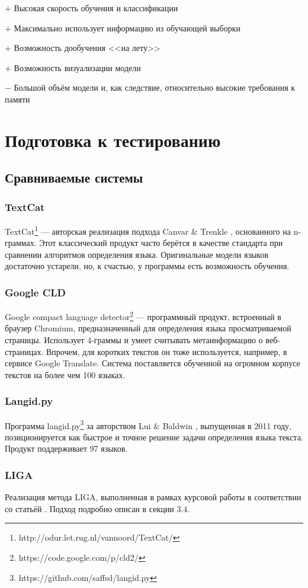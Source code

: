 \documentclass[a4paper, 14pt]{article}
\begin{document}
		$+$ Высокая скорость обучения и классификации
		
		$+$ Максимально использует информацию из обучающей выборки
		
		$+$ Возможность дообучения <<на лету>>
		
		$+$ Возможность визуализации модели
		
		$-$ Большой объём модели и, как следствие, относительно высокие требования к памяти
			
\section{Подготовка к тестированию}
		\subsection{Сравниваемые системы}
			\subsubsection{TextCat}
			TextCat\footnote{http://odur.let.rug.nl/vannoord/TextCat/} --- авторская реализация подхода Canvar \& Trenkle \cite{canvar}, основанного на n-граммах.
			Этот классический продукт часто берётся в качестве стандарта при сравнении алгоритмов определения языка. 
			Оригинальные модели языков достаточно устарели, но, к счастью, у программы есть возможность обучения.
			\subsubsection{Google CLD}
			Google compact language detector\footnote{https://code.google.com/p/cld2/} --- программный продукт, встроенный в браузер Chromium, 
			предназначенный для определения языка просматриваемой страницы. 
			Использует 4-граммы и умеет считывать метаинформацию
			о веб-страницах. Впрочем, для коротких текстов он тоже используется, например, в сервисе Google Translate. Система поставляется обученной
			на огромном корпусе текстов на более чем 100 языках.
			\subsubsection{Langid.py}
			Программа langid.py\footnote{https://github.com/saffsd/langid.py} за авторством Lui \& Baldwin \cite{langid}, выпущенная в 2011 году, позиционируется
			как быстрое и точное решение задачи определения языка текста. Продукт поддерживает 97 языков.
			\subsubsection{LIGA}
			Реализация метода LIGA, выполненная в рамках курсовой работы в соответствии со статьёй \cite{liga}. Подход подробно описан в секции 3.4.
\end{document}
